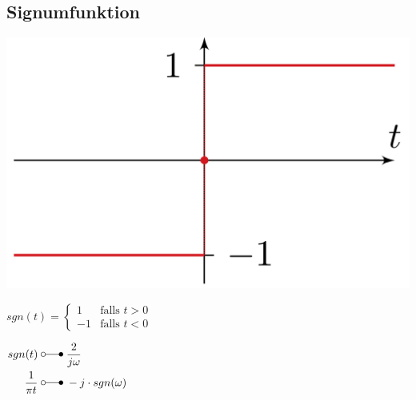 	\subsection{Signumfunktion}
		\begin{minipage}{0.2\textwidth}
			\includegraphics[width=\textwidth]{./bilder/funktionen/signF.png}
		\end{minipage}
		\qquad
		\begin{minipage}{0.45\textwidth}
			$sgn(t) = \begin{cases} 1 & \text{falls }t > 0 \\ -1 & \text{falls }t < 0 \end{cases}$
		\end{minipage}
		\qquad
		\begin{minipage}{0.25\textwidth}
            \begin{math}
                \begin{aligned}
                   sgn(t) \; &\laplace \; \frac{2}{j\omega}\\
                   \frac{1}{\pi t} \; &\laplace \; -j \cdot sgn(\omega)
                \end{aligned}
            \end{math}						
		\end{minipage}		

		

